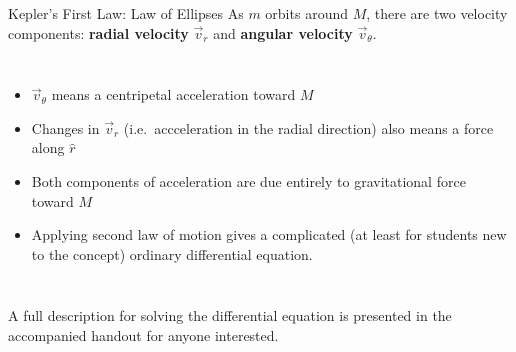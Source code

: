 \documentclass[12pt,compress,aspectratio=169]{beamer}
\begin{document}
\begin{frame}{Kepler's First Law: Law of Ellipses}
  As $m$ orbits around $M$, there are two velocity components: \textbf{radial
    velocity} $\vec v_r$ and \textbf{angular velocity} $\vec v_\theta$.
  \begin{columns}
    
    \begin{itemize}
    \item $\vec v_\theta$ means a centripetal acceleration toward $M$
    \item Changes in $\vec v_r$ (i.e.\ accceleration in the radial direction)
      also means a force along $\hat r$
    \item Both components of acceleration are due entirely to gravitational
      force toward $M$
    \item Applying second law of motion gives a complicated (at least for
      students new to the concept) ordinary differential equation.
    \end{itemize}
  \end{columns}
  \vspace{.1in}A full description for solving the differential equation is
  presented in the accompanied handout for anyone interested.
\end{frame}
\end{document}
